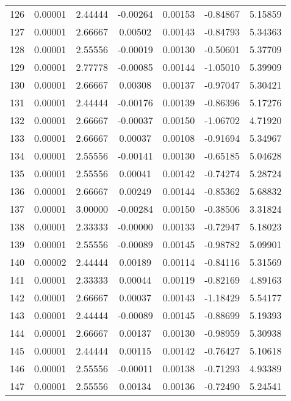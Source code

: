 \begin{longtable}{c c c c c c c}
126 &  0.00001 &      2.44444 & -0.00264 &   0.00153 &  -0.84867 &   5.15859 \\
127 &  0.00001 &      2.66667 &  0.00502 &   0.00143 &  -0.84793 &   5.34363 \\
128 &  0.00001 &      2.55556 & -0.00019 &   0.00130 &  -0.50601 &   5.37709 \\
129 &  0.00001 &      2.77778 & -0.00085 &   0.00144 &  -1.05010 &   5.39909 \\
130 &  0.00001 &      2.66667 &  0.00308 &   0.00137 &  -0.97047 &   5.30421 \\
131 &  0.00001 &      2.44444 & -0.00176 &   0.00139 &  -0.86396 &   5.17276 \\
132 &  0.00001 &      2.66667 & -0.00037 &   0.00150 &  -1.06702 &   4.71920 \\
133 &  0.00001 &      2.66667 &  0.00037 &   0.00108 &  -0.91694 &   5.34967 \\
134 &  0.00001 &      2.55556 & -0.00141 &   0.00130 &  -0.65185 &   5.04628 \\
135 &  0.00001 &      2.55556 &  0.00041 &   0.00142 &  -0.74274 &   5.28724 \\
136 &  0.00001 &      2.66667 &  0.00249 &   0.00144 &  -0.85362 &   5.68832 \\
137 &  0.00001 &      3.00000 & -0.00284 &   0.00150 &  -0.38506 &   3.31824 \\
138 &  0.00001 &      2.33333 & -0.00000 &   0.00133 &  -0.72947 &   5.18023 \\
139 &  0.00001 &      2.55556 & -0.00089 &   0.00145 &  -0.98782 &   5.09901 \\
140 &  0.00002 &      2.44444 &  0.00189 &   0.00114 &  -0.84116 &   5.31569 \\
141 &  0.00001 &      2.33333 &  0.00044 &   0.00119 &  -0.82169 &   4.89163 \\
142 &  0.00001 &      2.66667 &  0.00037 &   0.00143 &  -1.18429 &   5.54177 \\
143 &  0.00001 &      2.44444 & -0.00089 &   0.00145 &  -0.88699 &   5.19393 \\
144 &  0.00001 &      2.66667 &  0.00137 &   0.00130 &  -0.98959 &   5.30938 \\
145 &  0.00001 &      2.44444 &  0.00115 &   0.00142 &  -0.76427 &   5.10618 \\
146 &  0.00001 &      2.55556 & -0.00011 &   0.00138 &  -0.71293 &   4.93389 \\
147 &  0.00001 &      2.55556 &  0.00134 &   0.00136 &  -0.72490 &   5.24541 \\

\end{longtable}
